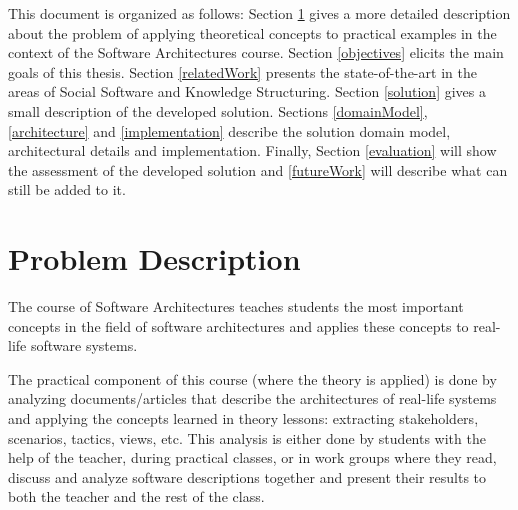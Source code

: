 \documentclass{llncs}
\begin{document}
This document is organized as follows: Section \ref{problemDescription} gives a more detailed description about the problem of applying theoretical concepts to practical examples in the context of the Software Architectures course. Section \ref{objectives} elicits the main goals of this thesis. Section \ref{relatedWork} presents the state-of-the-art in the areas of Social Software and Knowledge Structuring. Section \ref{solution} gives a small description of the developed solution. Sections \ref{domainModel}, \ref{architecture} and \ref{implementation} describe the solution domain model, architectural details and implementation. Finally, Section \ref{evaluation} will show the assessment of the developed solution and \ref{futureWork} will describe what can still be added to it.

\section{Problem Description}
\label{problemDescription}
The course of Software Architectures teaches students the most important concepts in the field of software architectures and applies these concepts to real-life software systems.

The practical component of this course (where the theory is applied) is done by analyzing documents/articles that describe the architectures of real-life systems and applying the concepts learned in theory lessons: extracting stakeholders, scenarios, tactics, views, etc.
This analysis is either done by students with the help of the teacher, during practical classes, or in work groups where they read, discuss and analyze software descriptions together and present their results to both the teacher and the rest of the class.
\end{document}
